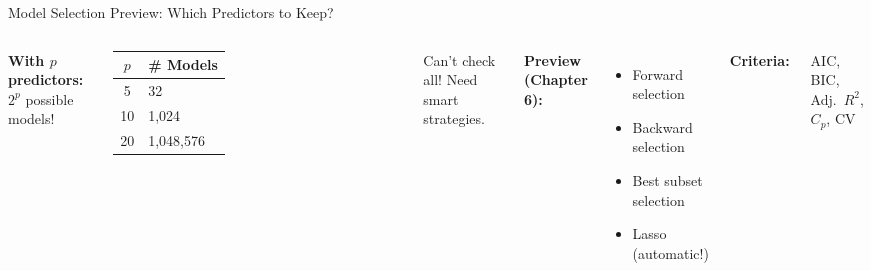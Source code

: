 \documentclass[aspectratio=169, 11pt]{beamer}
\begin{document}
\begin{frame}{Model Selection Preview: Which Predictors to Keep?}
\begin{columns}
\textbf{With $p$ predictors:} $2^p$ possible models!

\vspace{0.3em}
\begin{tabular}{cl}
\toprule
$p$ & \# Models \\
\midrule
5 & 32 \\
10 & 1,024 \\
20 & \textcolor{softred}{1,048,576} \\
\bottomrule
\end{tabular}

\vspace{0.3em}
Can't check all! Need smart strategies.

\textbf{Preview (Chapter 6):}

\begin{itemize}
  \item Forward selection
  \item Backward selection
  \item Best subset selection
  \item Lasso (automatic!)
\end{itemize}

\vspace{0.3em}
\textbf{Criteria:}

AIC, BIC, Adj.~$R^2$, $C_p$, CV
\end{columns}
\end{frame}
\end{document}
